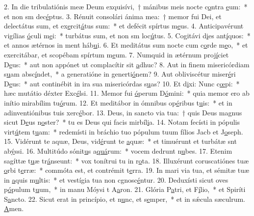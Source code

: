 2. In die tribulatiónis meæ Deum exquisívi,~† mánibus meis nocte c\uline{o}ntra \uline{e}um:~* et non sm dec\uline{é}ptus.
3. Rénuit consolári ánima mea:~† memor fui Dei, et delectátus sum, et ex\uline{e}rcit\uline{á}tus sum:~* et defécit spírtus m\uline{e}us.
4. Anticipavérunt vigílias \uline{ó}culi m\uline{e}i:~* turbátus sum, et non sm loc\uline{ú}tus.
5. Cogitávi d\uline{i}es ant\uline{í}quos:~* et annos ætérnos in ment háb\uline{u}i.
6. Et meditátus sum nocte cum c\uline{o}rde m\uline{e}o,~* et exercitábar, et scopébam spírtum m\uline{e}um.
7. Numquid in ætérnum proj\uline{í}ciet D\uline{e}us:~* aut non appónet ut complacítir sit \uline{a}dhuc?
8. Aut in finem misericórdiam s\uline{u}am absc\uline{í}ndet,~* a generatióne in generti\uline{ó}nem?
9. Aut obliviscétur miser\uline{é}ri D\uline{e}us:~* aut continébit in ira sua misericórdas s\uline{u}as?
10. Et d\uline{i}xi: Nunc c\uline{œ}pi:~* hæc mutátio déxter Exc\uline{é}lsi.
11. Memor fui \uline{ó}perum D\uline{ó}mini:~* quia memor ero ab inítio mirabílim tu\uline{ó}rum.
12. Et meditábor in ómnibus op\uline{é}ribus t\uline{u}is:~* et in adinventiónibus tuis xerc\uline{é}bor.
13. Deus, in sancto via tua:~† quis Deus magnus sicut D\uline{e}us n\uline{o}ster?~* tu es Deus qui facis mirbíl\uline{i}a.
14. Notam fecísti in pópulis virt\uline{ú}tem t\uline{u}am:~* redemísti in bráchio tuo pópulum tuum fílios Jacb et J\uline{o}seph.
15. Vidérunt te aquæ, Deus, vid\uline{é}runt te \uline{a}quæ:~* et timuérunt et turbátæ snt ab\uline{ý}ssi.
16. Multitúdo sónit\uline{u}s a\uline{quá}rum:~* vocem dedrunt n\uline{u}bes.
17. Etenim sagíttæ t\uline{u}æ tr\uline{á}nseunt:~* vox tonítrui tu in r\uline{o}ta.
18. Illuxérunt coruscatiónes tuæ \uline{o}rbi t\uline{e}rræ:~* commóta est, et contrémit t\uline{e}rra.
19. In mari via tua, et sémitæ tuæ in \uline{a}quis m\uline{u}ltis:~* et vestígia tua non cgnosc\uline{é}ntur.
20. Deduxísti sicut oves p\uline{ó}pulum t\uline{u}um,~* in manu Móysi t A\uline{a}ron.
21. Glória P\uline{a}tri, et F\uline{í}lio,~* et Spiríti S\uline{a}ncto.
22. Sicut erat in princípio, et n\uline{u}nc, et s\uline{e}mper,~* et in sǽcula sæculrum. \uline{A}men.
